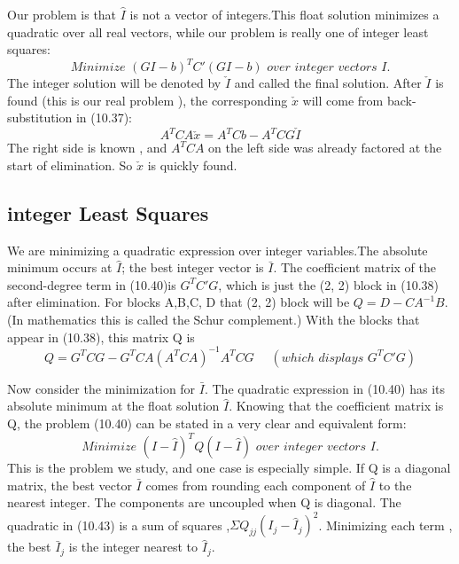 Our problem is that $\hat{I}$ is not a vector of integers.This float solution minimizes a quadratic over all real vectors, while our problem is really one of integer least squares:
\begin{equation}
Minimize\,\,(GI-b)^{T}C'(GI-b)\,\,over\,\, integer\,\, vectors\,\, I.
\end{equation}
The integer solution will be denoted by $\check{I}$ and called the final solution. After $\check{I}$ is found (this is our real problem ), the corresponding $\check{x}$ will come from back-substitution in (10.37):
\begin{equation}
A^{T}CA\check{x}=A^{T}Cb-A^{T}CG\check{I}
\end{equation}
The right side is known , and $A^{T}CA$ on the left side was already factored at the start of elimination. So $\check{x}$ is quickly found.

\subsection{integer Least Squares}

We are minimizing a quadratic expression over integer variables.The absolute minimum occurs at $\hat{I}$; the best integer vector is $\bar{I}$. The coefficient matrix of the second-degree term in (10.40)is $G^{T}C'G$, which is just the (2, 2) block in (10.38) after elimination. For blocks A,B,C, D that (2, 2) block will be $Q = D - CA^{-1}B$. (In mathematics this is called the
Schur complement.) With the blocks that appear in (10.38), this matrix Q is
\begin{equation}
Q = G^{T}CG - G^{T}CA(A^{T}CA)^{-1}A^{T}CG\,\,\,\,\,\,\,\,(which\,\,displays\,\,G^{T}C'G)
\end{equation}

Now consider the minimization for $\bar{I}$. The quadratic expression in (10.40) has its absolute minimum at the float solution $\hat{I}$. Knowing that the coefficient matrix is Q, the problem (10.40) can be stated in a very clear and equivalent form:
\begin{equation}
Minimize\,\,(I-\hat{I})^{T}Q(I-\hat{I})\,\,over\,\, integer\,\, vectors\,\, I.
\end{equation}
This is the problem we study, and one case is especially simple. If Q is a diagonal matrix, the best vector $\bar{I}$ comes from rounding each component of $\hat{I}$ to the nearest integer. The components are uncoupled when Q is diagonal. The quadratic in (10.43) is a sum of squares ,$\Sigma Q_{jj}(I_{j}-\hat{I}_{j})^{2}$. Minimizing each term , the best $\bar{I}_{j}$ is the integer nearest to $\hat{I}_{j}$.

